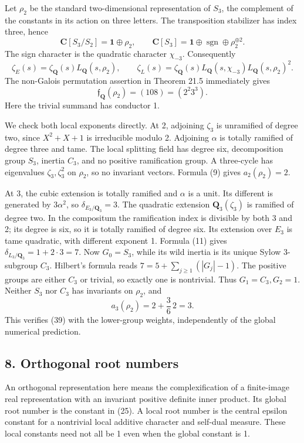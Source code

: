 \documentclass[11pt,a4paper]{article}
\begin{document}
Let \(\rho_2\) be the standard two-dimensional representation of
\(S_3\), the complement of the constants in its action on three letters.
The transposition stabilizer has index three, hence \[
\mathbf C[S_3/S_2]=\mathbf1\oplus\rho_2,
\qquad
\mathbf C[S_3]=\mathbf1\oplus\operatorname{sgn}\oplus\rho_2^{\oplus2}.
\tag{37}
\] The sign character is the quadratic character \(\chi_{-3}\).
Consequently \[
\zeta_E(s)=\zeta_{\mathbf Q}(s)L_{\mathbf Q}(s,\rho_2),\qquad
\zeta_L(s)=\zeta_{\mathbf Q}(s)L_{\mathbf Q}(s,\chi_{-3})L_{\mathbf Q}(s,\rho_2)^2.
\tag{38}
\] The non-Galois permutation assertion in Theorem 21.5 immediately
gives \[
\mathfrak f_{\mathbf Q}(\rho_2)=(108)=(2^2 3^3).
\tag{39}
\] Here the trivial summand has conductor 1.

We check both local exponents directly. At 2, adjoining \(\zeta_3\) is
unramified of degree two, since \(X^2+X+1\) is irreducible modulo 2.
Adjoining \(\alpha\) is totally ramified of degree three and tame. The
local splitting field has degree six, decomposition group \(S_3\),
inertia \(C_3\), and no positive ramification group. A three-cycle has
eigenvalues \(\zeta_3,\zeta_3^2\) on \(\rho_2\), so no invariant
vectors. Formula (9) gives \(a_2(\rho_2)=2\).

At 3, the cubic extension is totally ramified and \(\alpha\) is a unit.
Its different is generated by \(3\alpha^2\), so
\(\delta_{E_3/\mathbf Q_3}=3\). The quadratic extension
\(\mathbf Q_3(\zeta_3)\) is ramified of degree two. In the compositum
the ramification index is divisible by both 3 and 2; its degree is six,
so it is totally ramified of degree six. Its extension over \(E_3\) is
tame quadratic, with different exponent 1. Formula (11) gives
\(\delta_{L_3/\mathbf Q_3}=1+2\cdot3=7\). Now \(G_0=S_3\), while its
wild inertia is its unique Sylow 3-subgroup \(C_3\). Hilbert's formula
reads \(7=5+\sum_{j\geq1}(|G_j|-1)\). The positive groups are either
\(C_3\) or trivial, so exactly one is nontrivial. Thus
\(G_1=C_3,G_2=1\). Neither \(S_3\) nor \(C_3\) has invariants on
\(\rho_2\), and \[
a_3(\rho_2)=2+\frac36\,2=3.
\tag{40}
\] This verifies (39) with the lower-group weights, independently of the
global numerical prediction.

\subsection{8. Orthogonal root numbers}\label{orthogonal-root-numbers}

An orthogonal representation here means the complexification of a
finite-image real representation with an invariant positive definite
inner product. Its global root number is the constant in (25). A local
root number is the central epsilon constant for a nontrivial local
additive character and self-dual measure. These local constants need not
all be 1 even when the global constant is 1.
\end{document}
